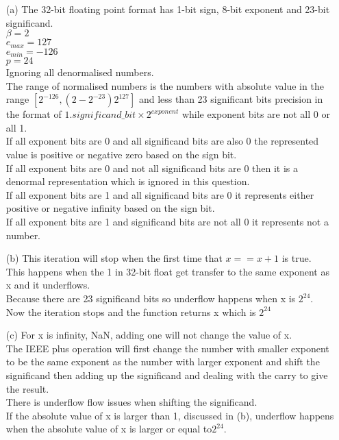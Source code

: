 \documentclass[10pt,twoside,a4paper]{article}
\begin{document}
\begin{itemize}
\item[(a)]
The 32-bit floating point format has 1-bit sign, 8-bit exponent and 23-bit significand.
\\$\beta = 2$
\\$e_{max}=127$
\\$e_{min}=-126$
\\$p=24$
\\Ignoring all denormalised numbers.
\\The range of normalised numbers is the numbers with absolute value in the range $[2^{-126},(2-2^{-23})2^{127}]$ and less than 23 significant bits precision in the format of $1.significand\_bit \times 2^{exponent}$ while exponent bits are not all 0 or all 1.
\\If all exponent bits are 0 and all significand bits are also 0 the represented value is positive or negative zero based on the sign bit.
\\If all exponent bits are 0 and not all significand bits are 0 then it is a denormal representation which is ignored in this question.
\\If all exponent bits are 1 and all significand bits are 0 it represents either positive or negative infinity based on the sign bit.
\\If all exponent bits are 1 and significand bits are not all 0 it represents not a number.
\item[(b)]
This iteration will stop when the first time that $x==x+1$ is true.
\\This happens when the 1 in 32-bit float  get transfer to the same exponent as x and it underflows.
\\Because there are 23 significand bits so underflow happens when x is $2^{24}$.
\\Now the iteration stops and the function returns x which is $2^{24}$
\item[(c)]
For x is infinity, NaN, adding one will not change the value of x.
\\The IEEE plus operation will first change the number with smaller exponent to be the same exponent as the number with larger exponent and shift the significand then adding up the significand and dealing with the carry to give the result.
\\There is underflow flow issues when shifting the significand.
\\If the absolute value of x is larger than 1, discussed in (b), underflow happens when the absolute value of x is larger or equal to$2^{24}$.

\end{itemize}
\end{document}
